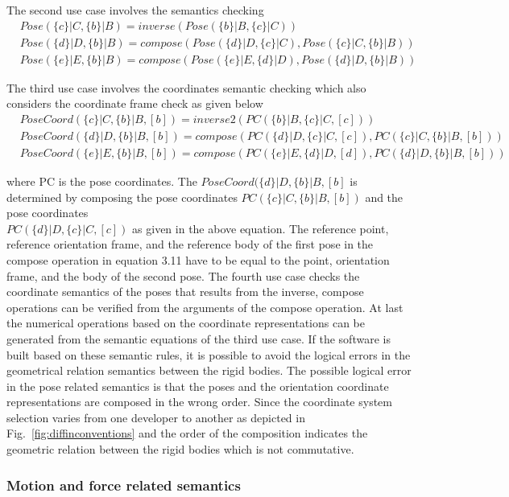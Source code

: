 The second use case involves the semantics checking
\begin{align}
& Pose(\{c\}|C, \{b\}|B) = inverse(Pose(\{b\}|B, \{c\}|C)) \\
& Pose(\{d\}|D, \{b\}|B) = compose(Pose(\{d\}|D, \{c\}|C), Pose(\{c\}|C, \{b\}|B)) \\
& Pose(\{e\}|E, \{b\}|B) = compose(Pose(\{e\}|E, \{d\}|D), Pose(\{d\}|D, \{b\}|B))
\end{align}

The third use case involves the coordinates semantic checking which also considers the coordinate frame check as given below
\begin{align}
& PoseCoord(\{c\}|C, \{b\}|B, [b]) = inverse2(PC(\{b\}|B, \{c\}|C, [c])) \\
& PoseCoord(\{d\}|D, \{b\}|B, [b]) = compose(PC(\{d\}|D, \{c\}|C, [c]), PC(\{c\}|C, \{b\}|B, [b])) \\
& PoseCoord(\{e\}|E, \{b\}|B, [b]) = compose(PC(\{e\}|E, \{d\}|D, [d]), PC(\{d\}|D, \{b\}|B, [b]))
\end{align}

where PC is the pose coordinates. The $PoseCoord(\{d\}|D, \{b\}|B, [b]$ is determined by composing the pose coordinates $PC(\{c\}|C, \{b\}|B, [b])$ and the pose coordinates \\$PC(\{d\}|D, \{c\}|C, [c])$ as given in the above equation. The reference point, reference orientation frame, and the reference body of the first pose in the compose operation in equation 3.11 have to be equal to the point, orientation frame, and the body of the second pose. The fourth use case checks the coordinate semantics of the poses that results from the inverse, compose operations can be verified from the arguments of the compose operation. At last the numerical operations based on the coordinate representations can be generated from the semantic equations of the third use case. If the software is built based on these semantic rules, it is possible to avoid the logical errors in the geometrical relation semantics between the rigid bodies. The possible logical error in the pose related semantics is that the poses and the orientation coordinate representations are composed in the wrong order. Since the coordinate system selection varies from one developer to another as depicted in Fig.~\ref{fig:diffinconventions} and the order of the composition indicates the geometric relation between the rigid bodies which is not commutative.

\subsubsection*{Motion and force related semantics}

